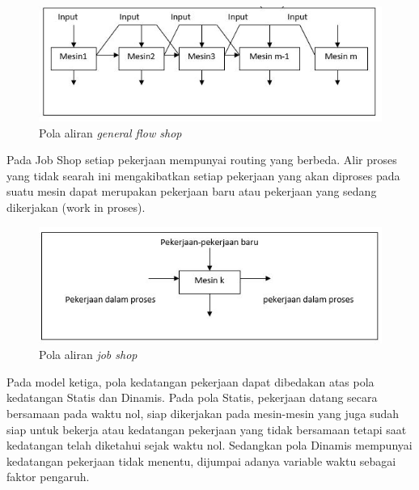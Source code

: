 \documentclass[a4paper,twoside]{article}
\begin{document}
\begin{enumerate}
\begin{itemize}
	
		\begin{figure}[H]
			\centering
			\includegraphics[scale=0.60]{gambar2}
			\caption[General Flow Shop] {Pola aliran \it{general flow shop}}
			\label{fig:generalflowshop}
		\end{figure}
	
		 Pada Job Shop setiap pekerjaan mempunyai routing yang berbeda. Alir proses yang tidak searah ini mengakibatkan setiap pekerjaan yang akan diproses pada suatu mesin dapat merupakan pekerjaan baru atau pekerjaan yang sedang dikerjakan (work in proses).
		 
		\begin{figure}[H]
		 	\centering
		 	\includegraphics[scale=0.60]{gambar3}
		 	\caption[Job Shop] {Pola aliran \it{job shop}}
		 	\label{fig:jobshop}
		 \end{figure}
		 
		 
		 Pada model ketiga, pola kedatangan pekerjaan dapat dibedakan atas pola kedatangan Statis dan Dinamis. Pada pola Statis, pekerjaan datang secara bersamaan pada waktu nol, siap dikerjakan pada mesin-mesin yang juga sudah siap untuk bekerja atau kedatangan pekerjaan yang tidak bersamaan tetapi saat kedatangan telah diketahui sejak waktu nol. Sedangkan pola Dinamis mempunyai kedatangan pekerjaan tidak menentu, dijumpai adanya variable waktu sebagai faktor pengaruh.
		 

\end{itemize}
\end{enumerate}
\end{document}
